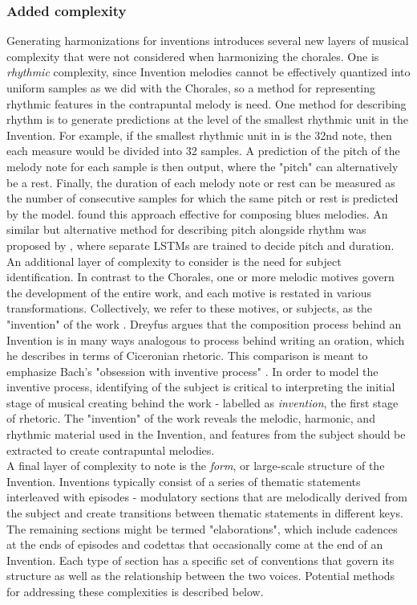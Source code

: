 \documentclass[11pt]{book}
\begin{document}
\subsubsection{Added complexity}
Generating harmonizations for inventions introduces several new layers of musical complexity that were not considered when harmonizing the chorales. One is \textit{rhythmic} complexity, since Invention melodies cannot be effectively quantized into uniform samples as we did with the Chorales, so a method for representing rhythmic features in the contrapuntal melody is need. One method for describing rhythm is to generate predictions at the level of the smallest rhythmic unit in the Invention. For example, if the smallest rhythmic unit in is the 32nd note, then each measure would be divided into 32 samples. A prediction of the pitch of the melody note for each sample is then output, where the "pitch" can alternatively be a rest. Finally, the duration of each melody note or rest can be measured as the number of consecutive samples for which the same pitch or rest is predicted by the model. \citet{eck2002blues} found this approach effective for composing blues melodies. An similar but alternative method for describing pitch alongside rhythm was proposed by \citet{franklin2006jazz}, where separate LSTMs are trained to decide pitch and duration. \\

An additional layer of complexity to consider is the need for subject identification. In contrast to the Chorales, one or more melodic motives govern the development of the entire work, and each motive is restated in various transformations. Collectively, we refer to these motives, or subjects, as the "invention" of the work \citep[p.~10]{dreyfus1996bach}. Dreyfus argues that the composition process behind an Invention is in many ways analogous to process behind writing an oration, which he describes in terms of Ciceronian rhetoric. This comparison is meant to emphasize Bach's "obsession with inventive process" \citep[p.~35]{dreyfus1996bach}. In order to model the inventive process, identifying of the subject is critical to interpreting the initial stage of musical creating behind the work - labelled as \textit{invention}, the first stage of rhetoric. The "invention" of the work reveals the melodic, harmonic, and rhythmic material used in the Invention, and features from the subject should be extracted to create contrapuntal melodies. \\

A final layer of complexity to note is the \textit{form}, or large-scale structure of the Invention. Inventions typically consist of a series of thematic statements interleaved with episodes - modulatory sections that are melodically derived from the subject and create transitions between thematic statements in different keys. The remaining sections might be termed "elaborations", which include cadences at the ends of episodes and codettas that occasionally come at the end of an Invention. Each type of section has a specific set of conventions that govern its structure as well as the relationship between the two voices. Potential methods for addressing these complexities is described below.
\end{document}
